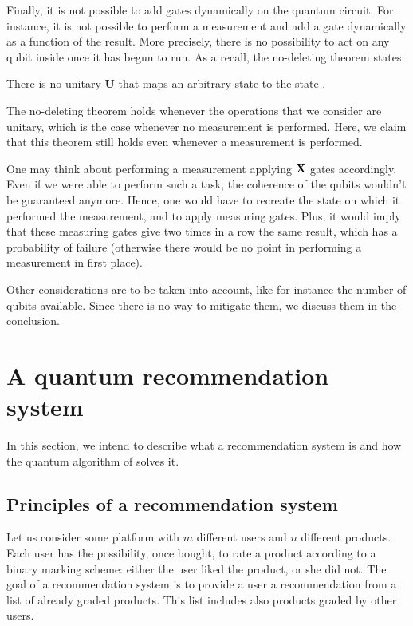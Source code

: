 \documentclass[11pt, a4paper]{article}
\begin{document}
            Finally, it is not possible to add gates dynamically on the quantum circuit. For instance, it is not possible to perform a measurement and add a gate dynamically as a function of the result. More precisely, there is no possibility to act on any qubit inside once it has begun to run. As a recall, the no-deleting theorem states:
            
            \begin{theorem}
                There is no unitary \(\mathbf{U}\) that maps an arbitrary state \ket{\psi} to the state .
            \end{theorem}
            
            The no-deleting theorem holds whenever the operations that we consider are unitary, which is the case whenever no measurement is performed. Here, we claim that this theorem still holds even whenever a measurement is performed.
            
            One may think about performing a measurement applying \(\mathbf{X}\) gates accordingly. Even if we were able to perform such a task, the coherence of the qubits wouldn't be guaranteed anymore. Hence, one would have to recreate the state on which it performed the measurement, and to apply measuring gates. Plus, it would imply that these measuring gates give two times in a row the same result, which has a probability of failure (otherwise there would be no point in performing a measurement in first place).
            
            Other considerations are to be taken into account, like for instance the number of qubits available. Since there is no way to mitigate them, we discuss them in the conclusion.
    \section{A quantum recommendation system}
        \label{sec:QRS}
        In this section, we intend to describe what a recommendation system is and how the quantum algorithm of \citeauthor{QRS} solves it.
        \subsection{Principles of a recommendation system}
            Let us consider some platform with \(m\) different users and \(n\) different products. Each user has the possibility, once bought, to rate a product according to a binary marking scheme: either the user liked the product, or she did not. The goal of a recommendation system is to provide a user a recommendation from a list of already graded products. This list includes also products graded by other users.
            
\end{document}
